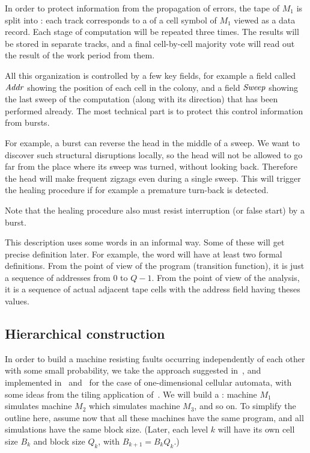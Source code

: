 \documentclass[11pt]{memoir}
\theoremstyle{definition} %
\newcommand{\fld}[1]{\ensuremath{\textit{#1\/}}}
\def\B{B}
\newcommand{\Q}{Q}
\newcommand{\Addr}{\fld{Addr}}
\newcommand{\Sweep}{\fld{Sweep}}
\begin{document}
In order to protect information from the propagation of errors,
the tape of \( M_{1} \) is split into : each track corresponds to a 
 of a cell symbol of \( M_{1} \) viewed as a data record.
Each stage of computation will be repeated three times.
The results will be stored in separate tracks, and a final cell-by-cell majority vote
will read out the result of the work period from them.

All this organization is controlled by a few key fields, for example a field
called \( \Addr \) showing the position of each cell in the colony, and a field
\( \Sweep \) showing the last sweep of the computation (along with its direction)
that has been performed already.
The most technical part is to protect this control information from bursts.

For example, a burst can reverse the head in the middle of a sweep.
We want to discover such structural disruptions locally, so
the head will not be allowed to go far from the place where its sweep was turned, without
looking back.
Therefore the head will make frequent zigzags even during a single sweep.
This will trigger the healing procedure if for example a premature turn-back is detected.

Note that the healing procedure also must resist interruption (or false start) by a burst.

\begin{remark}
This description uses some words in an informal way.
Some of these will get precise definition later.
For example, the word  will have at least two formal definitions.
From the point of view of the program (transition function), it is just a 
sequence of addresses from \( 0 \) to \( \Q-1 \).
From the point of view of the analysis, it is a sequence of
actual adjacent tape cells with the address field having theses values.
\end{remark}


\subsection{Hierarchical construction}\label{sec:hier}

In order to build a machine resisting faults 
occurring independently of each other with some small probability,
we take the approach suggested in~\cite{Kurd78},
and implemented in~\cite{Gacs1dim86} and~\cite{GacsSorg01}
for the case of one-dimensional cellular automata, with some ideas
from the tiling application of~\cite{DurandRomashShenTiling12}.
We will build a :
machine \( M_{1} \) simulates machine \( M_{2} \) which 
simulates machine \( M_3 \), and so on.
To simplify the outline here, assume now
that all these machines have the same program,
and all simulations have the same block size.
(Later, each level \( k \) will have its own cell size \( \B_{k} \) and block size \( \Q_{k} \),
with \( \B_{k+1}=\B_{k}\Q_{k} \).)
\end{document}
